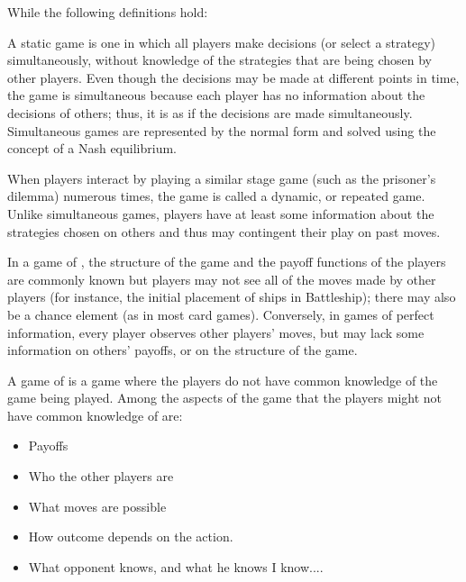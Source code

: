 While the following definitions hold:

\begin{definition} 
	A static game is one in which all players make decisions (or select a strategy) simultaneously, without knowledge of the strategies that are being chosen by other players. Even though the decisions may be made at different points in time, the game is simultaneous because each player has no information about the decisions of others; thus, it is as if the decisions are made simultaneously. Simultaneous games are represented by the normal form and solved using the concept of a Nash equilibrium.
\end{definition}

\begin{definition} 
When players interact by playing a similar stage game (such as the prisoner's dilemma) numerous times, the game is called a dynamic, or repeated game. Unlike simultaneous games, players have at least some information about the strategies chosen on others and thus may contingent their play on past moves.
\end{definition}

\begin{definition}
	In a game of , the structure of the game and the payoff functions of the players are commonly known but players may not see all of the moves made by other players (for instance, the initial placement of ships in Battleship); there may also be a chance element (as in most card games). Conversely, in games of perfect information, every player observes other players' moves, but may lack some information on others' payoffs, or on the structure of the game.
\end{definition}

\begin{definition} 
A game of  is a game where the players do not have common knowledge of the game being played. Among the aspects of the game that the players might not have common knowledge of are:
	\begin{itemize}
		\item Payoffs
		\item Who the other players are
		\item What moves are possible
		\item How outcome depends on the action.
		\item What opponent knows, and what he knows I know....
	\end{itemize}
\end{definition}

